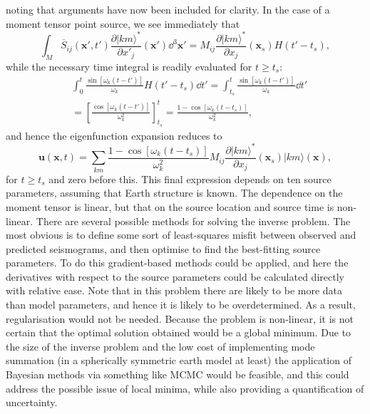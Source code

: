 \documentclass[a4paper,10pt]{paper}
\begin{document}
\begin{enumerate}
\begin{enumerate}
noting that arguments have now been included for clarity. In the case of a moment tensor point source, we see immediately that
\begin{equation*}
    \int_{M}\overline{S}_{ij}(\mathbf{x}',t')\frac{\partial|km\rangle^{*}}{\partial x'_{j}}(\mathbf{x}')\dd^{3}\mathbf{x}' = M_{ij}\frac{\partial|km\rangle^{*}}{\partial x_{j}}(\mathbf{x}_{s})H(t'-t_{s}),
\end{equation*}
while the necessary time integral is readily evaluated for $t\ge t_{s}$:
\begin{align*}
    &\int_{0}^{t}\frac{\sin[\omega_{k}(t-t')]}{\omega_{k}}H(t'-t_{s})\dd t' = \int_{t_s}^{t}\frac{\sin[\omega_{k}(t-t')]}{\omega_{k}}\dd t' \\ &= \left[\frac{\cos[\omega_k(t-t')]}{\omega_k^2}\right]_{t_s}^t = \frac{1-\cos[\omega_{k}(t-t_{s})]}{\omega_{k}^{2}},
\end{align*}
and hence the eigenfunction expansion reduces to
\begin{equation*}
    \mathbf{u}(\mathbf{x},t)=\sum_{km}\frac{1-\cos[\omega_{k}(t-t_{s})]}{\omega_{k}^{2}}M_{ij}\frac{\partial|km\rangle^{*}}{\partial x_{j}}(\mathbf{x}_{s})|km\rangle(\mathbf{x}),
\end{equation*}
for $t\ge t_{s}$ and zero before this. This final expression depends on ten source parameters, assuming that Earth structure is known. The dependence on the moment tensor is linear, but that on the source location and source time is non-linear. There are several possible methods for solving the inverse problem. The most obvious is to define some sort of least-squares misfit between observed and predicted seismograms, and then optimise to find the best-fitting source parameters. To do this gradient-based methods could be applied, and here the derivatives with respect to the source parameters could be calculated directly with relative ease. Note that in this problem there are likely to be more data than model parameters, and hence it is likely to be overdetermined. As a result, regularisation would not be needed. Because the problem is non-linear, it is not certain that the optimal solution obtained would be a global minimum. Due to the size of the inverse problem and the low cost of implementing mode summation (in a spherically symmetric earth model at least) the application of Bayesian methods via something like MCMC would be feasible, and this could address the possible issue of local minima, while also providing a quantification of uncertainty.

\end{enumerate}


\end{enumerate}
\end{document}
